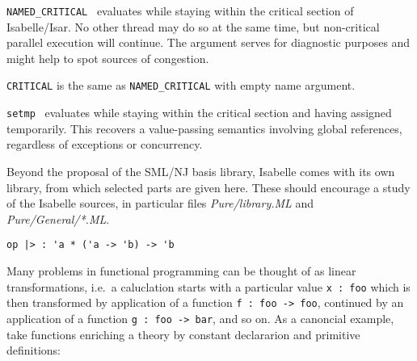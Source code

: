 \begin{isabellebody}
\begin{isamarkuptext}
  \begin{description}

  \item \verb|NAMED_CRITICAL|~ evaluates 
  while staying within the critical section of Isabelle/Isar.  No
  other thread may do so at the same time, but non-critical parallel
  execution will continue.  The  argument serves for
  diagnostic purposes and might help to spot sources of congestion.

  \item \verb|CRITICAL| is the same as \verb|NAMED_CRITICAL| with empty
  name argument.

  \item \verb|setmp|~ evaluates 
  while staying within the critical section and having  assigned temporarily.  This recovers a value-passing
  semantics involving global references, regardless of exceptions or
  concurrency.

  \end{description}%
\end{isamarkuptext}%
\isamarkuptrue%
%
\endisatagmlref
{\isafoldmlref}%
%
\isadelimmlref
%
\endisadelimmlref
%
\isamarkuptrue%
%
\begin{isamarkuptext}%
Beyond the proposal of the SML/NJ basis library, Isabelle comes
  with its own library, from which selected parts are given here.
  These should encourage a study of the Isabelle sources,
  in particular files \emph{Pure/library.ML} and \emph{Pure/General/*.ML}.%
\end{isamarkuptext}%
\isamarkuptrue%
%
\isamarkuptrue%
%
\isadelimmlref
%
\endisadelimmlref
%
\isatagmlref
%
\begin{isamarkuptext}%
\begin{mldecls}
  \verb|op |\verb,|,\verb|> : 'a * ('a -> 'b) -> 'b| \\
  \end{mldecls}%
\end{isamarkuptext}%
\isamarkuptrue%
%
\endisatagmlref
{\isafoldmlref}%
%
\isadelimmlref
%
\endisadelimmlref
%
\isadelimML
%
\endisadelimML
%
\isatagML
%
\endisatagML
{\isafoldML}%
%
\isadelimML
%
\endisadelimML
%
\begin{isamarkuptext}%
\noindent Many problems in functional programming can be thought of
  as linear transformations, i.e.~a caluclation starts with a
  particular value \verb|x : foo| which is then transformed
  by application of a function \verb|f : foo -> foo|,
  continued by an application of a function \verb|g : foo -> bar|,
  and so on.  As a canoncial example, take functions enriching
  a theory by constant declararion and primitive definitions:


\end{isamarkuptext}
\end{isabellebody}
